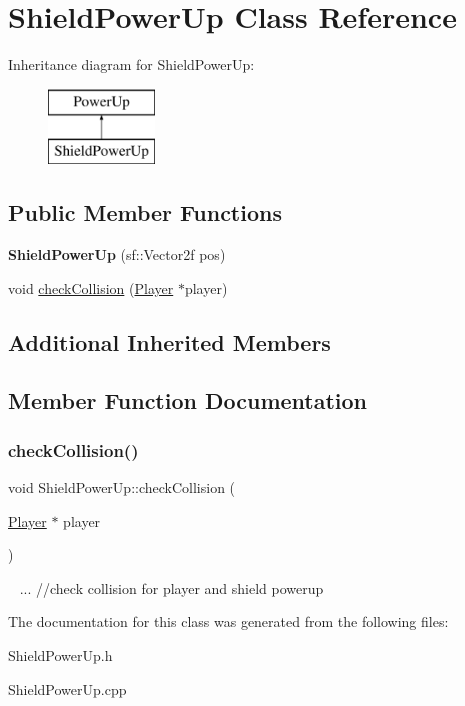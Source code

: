 \hypertarget{class_shield_power_up}{}\section{Shield\+Power\+Up Class Reference}
\label{class_shield_power_up}
Inheritance diagram for Shield\+Power\+Up\+:\begin{figure}[H]
\begin{center}
\leavevmode
\includegraphics[height=2.000000cm]{class_shield_power_up}
\end{center}
\end{figure}
\subsection*{Public Member Functions}
\begin{DoxyCompactItemize}
\item 
\mbox{\label{class_shield_power_up_ac41f988ed81ed73f22cf83fbf1481964}} 
{\bfseries Shield\+Power\+Up} (sf\+::\+Vector2f pos)
\item 
void \mbox{\hyperlink{class_shield_power_up_a4055c8c6d5412da1c338baca3658a301}{check\+Collision}} (\mbox{\hyperlink{class_player}{Player}} $\ast$player)
\end{DoxyCompactItemize}
\subsection*{Additional Inherited Members}


\subsection{Member Function Documentation}
\mbox{\label{class_shield_power_up_a4055c8c6d5412da1c338baca3658a301}} 
\subsubsection{\texorpdfstring{check\+Collision()}{checkCollision()}}
{\footnotesize\ttfamily void Shield\+Power\+Up\+::check\+Collision (\begin{DoxyParamCaption}\item[{\mbox{\hyperlink{class_player}{Player}} $\ast$}]{player }\end{DoxyParamCaption})}

~\newline
... //check collision for player and shield powerup

The documentation for this class was generated from the following files\+:\begin{DoxyCompactItemize}
\item 
Shield\+Power\+Up.\+h\item 
Shield\+Power\+Up.\+cpp\end{DoxyCompactItemize}

